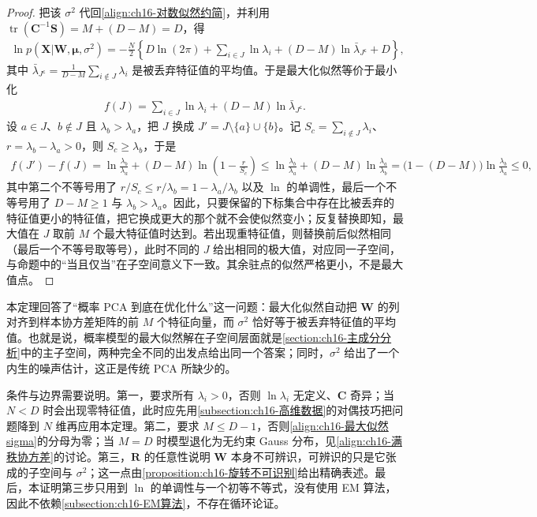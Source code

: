 \documentclass[../../main.tex]{subfiles}
\begin{document}
\begin{proof}
把该 $\sigma^2$ 代回\eqref{align:ch16-对数似然约简}，并利用 $\operatorname{tr}(\bm{C}^{-1}\bm{S})=M+(D-M)=D$，得
\begin{align*}
  \ln p(\bm{X}|\bm{W},\bm{\mu},\sigma^2)=-\frac{N}{2}\left\{D\ln(2\pi)+\sum_{i\in J}\ln\lambda_i+(D-M)\ln\bar{\lambda}_{J^{\mathsf c}}+D\right\},
\end{align*}
其中 $\bar{\lambda}_{J^{\mathsf c}}=\frac{1}{D-M}\sum_{i\notin J}\lambda_i$ 是被丢弃特征值的平均值。于是最大化似然等价于最小化
\begin{align*}
  f(J)=\sum_{i\in J}\ln\lambda_i+(D-M)\ln\bar{\lambda}_{J^{\mathsf c}}.
\end{align*}
设 $a\in J$、$b\notin J$ 且 $\lambda_b>\lambda_a$，把 $J$ 换成 $J'=J\setminus\{a\}\cup\{b\}$。记 $S_c=\sum_{i\notin J}\lambda_i$、$r=\lambda_b-\lambda_a>0$，则 $S_c\geqslant\lambda_b$，于是
\begin{align*}
  f(J')-f(J)=\ln\frac{\lambda_b}{\lambda_a}+(D-M)\ln\left(1-\frac{r}{S_c}\right)
  \leqslant\ln\frac{\lambda_b}{\lambda_a}+(D-M)\ln\frac{\lambda_a}{\lambda_b}
  =\bigl(1-(D-M)\bigr)\ln\frac{\lambda_b}{\lambda_a}\leqslant0,
\end{align*}
其中第二个不等号用了 $r/S_c\leqslant r/\lambda_b=1-\lambda_a/\lambda_b$ 以及 $\ln$ 的单调性，最后一个不等号用了 $D-M\geqslant1$ 与 $\lambda_b>\lambda_a$。因此，只要保留的下标集合中存在比被丢弃的特征值更小的特征值，把它换成更大的那个就不会使似然变小；反复替换即知，最大值在 $J$ 取前 $M$ 个最大特征值时达到。若出现重特征值，则替换前后似然相同（最后一个不等号取等号），此时不同的 $J$ 给出相同的极大值，对应同一子空间，与命题中的“当且仅当”在子空间意义下一致。其余驻点的似然严格更小，不是最大值点。
\end{proof}

\begin{remark}
本定理回答了“概率 PCA 到底在优化什么”这一问题：最大化似然自动把 $\bm{W}$ 的列对齐到样本协方差矩阵的前 $M$ 个特征向量，而 $\sigma^2$ 恰好等于被丢弃特征值的平均值。也就是说，概率模型的最大似然解在子空间层面就是\cref{section:ch16-主成分分析}中的主子空间，两种完全不同的出发点给出同一个答案；同时，$\sigma^2$ 给出了一个内生的噪声估计，这正是传统 PCA 所缺少的。

条件与边界需要说明。第一，要求所有 $\lambda_i>0$，否则 $\ln\lambda_i$ 无定义、$\bm{C}$ 奇异；当 $N<D$ 时会出现零特征值，此时应先用\cref{subsection:ch16-高维数据}的对偶技巧把问题降到 $N$ 维再应用本定理。第二，要求 $M\leqslant D-1$，否则\eqref{align:ch16-最大似然sigma}的分母为零；当 $M=D$ 时模型退化为无约束 Gauss 分布，见\eqref{align:ch16-满秩协方差}的讨论。第三，$\bm{R}$ 的任意性说明 $\bm{W}$ 本身不可辨识，可辨识的只是它张成的子空间与 $\sigma^2$；这一点由\cref{proposition:ch16-旋转不可识别}给出精确表述。最后，本证明第三步只用到 $\ln$ 的单调性与一个初等不等式，没有使用 EM 算法，因此不依赖\cref{subsection:ch16-EM算法}，不存在循环论证。
\end{remark}
\end{document}
